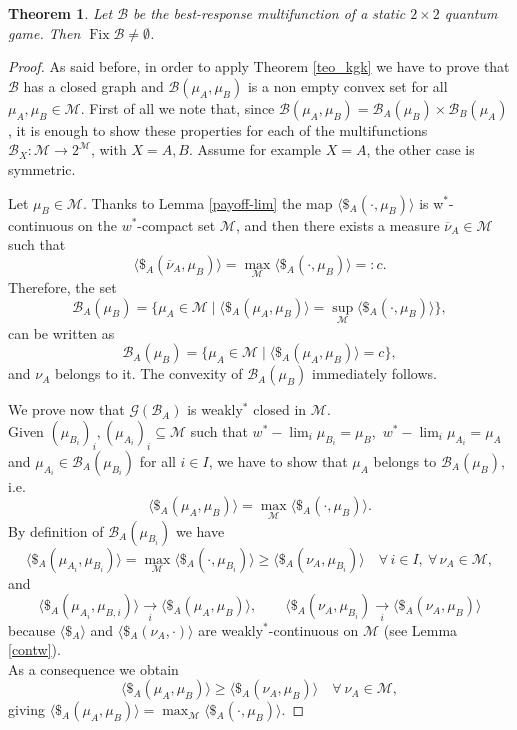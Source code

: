 \documentclass[11pt,a4paper,twoside]{article}
\newtheorem{theorem}{Theorem}
\begin{document}
\begin{theorem}\label{esistenza}
Let $\mathcal{B}$ be the best-response multifunction of a static $2\times 2$ quantum game. Then
$\operatorname{Fix} \mathcal{B} \neq \emptyset$.
\end{theorem}
\begin{proof}
As said before, in order to apply Theorem \ref{teo_kgk} we have to prove that $\mathcal{B}$ has a closed graph and $\mathcal{B}(\mu_A,\mu_B)$ is a non empty convex set for all $\mu_A,\mu_B\in\mathcal{M}$. First of all we note that, since $\mathcal{B}(\mu_A,\mu_B) = \mathcal{B}_A(\mu_B) \times \mathcal{B}_B(\mu_A)$, it is enough to show these properties for each of the multifunctions $\mathcal{B}_X:\mathcal{M}\to 2^\mathcal{M}$, with $X=A,B$. Assume for example $X=A$, the other case is symmetric.

Let $\mu_B \in \mathcal{M}$. Thanks to Lemma \ref{payoff-lim} the map \( \langle\$_A (\cdot, \mu_B)\rangle\) is w$^*$-continuous on the $w^*$-compact set $\mathcal{M}$, and then there exists a measure $\overline{\nu}_A \in \mathcal{M}$ such that 
$$\langle\$_A (\overline{\nu}_A, \mu_B)\rangle = \max_\mathcal{M} \langle\$_A (\cdot, \mu_B)\rangle=:c.$$
Therefore, the set
\[
\mathcal{B}_A (\mu_B) = \{\mu_A \in \mathcal{M} \mid \langle\$_A (\mu_A, \mu_B)\rangle = \sup_{\mathcal{M}} \langle\$_A (\cdot, \mu_B)\rangle\},
\]
can be written as
 \[ \mathcal{B}_A (\mu_B) = \{\mu_A \in \mathcal{M} \mid \langle\$_A (\mu_A, \mu_B)\rangle = c\}, \] 
 and $\nu_A$ belongs to it.
 The convexity of $\mathcal{B}_A (\mu_B)$ immediately follows.

We prove now that $\mathcal{G}(\mathcal{B}_A)$ is weakly$^*$ closed in $\mathcal{M}$.\\
Given \((\mu_{B_i})_i, (\mu_{A_i})_i \subseteq \mathcal{M}\) such that $w^*-\lim_i\mu_{B_i}=\mu_B$,\ $w^*-\lim_i\mu_{A_i}=\mu_A$ and \(\mu_{A_i} \in \mathcal{B}_A (\mu_{B_i})\) for all $i\in I$, we have to show that \(\mu_A\) belongs to $\mathcal{B}_A (\mu_B)$, i.e. \[\langle \$_A (\mu_A, \mu_B)\rangle =\max_{\mathcal{M}} \langle\$_A (\cdot, \mu_B)\rangle.\]
By definition of $\mathcal{B}_A (\mu_{B_i})$ we have
\[ \langle\$_A (\mu_{A_i}, \mu_{B_i})\rangle = \max_\mathcal{M} \langle\$_A (\cdot, \mu_{B_i})\rangle \geq \langle\$_A (\nu_A, \mu_{B_i})\rangle \quad \forall\, i\in I,\  \forall\, \nu_A \in \mathcal{M},\]
and $$\langle\$_A(\mu_{A_i}, \mu_{B,i})\rangle \xrightarrow[i]{} \langle\$_A(\mu_A, \mu_B)\rangle,\qquad\langle\$_A(\nu_A, \mu_{B_i}) \xrightarrow[i]{} \langle\$_A(\nu_A, \mu_B)\rangle$$ because $\langle\$_A\rangle$ and $\langle\$_A(\nu_A, \cdot)\rangle$ are weakly$^*$-continuous on $\mathcal{M}$ (see Lemma \ref{contw}).\\
As a consequence we obtain
$$\langle\$_A(\mu_A, \mu_B)\rangle \geq \langle\$_A(\nu_A, \mu_B)\rangle \quad \forall\  \nu_A \in \mathcal{M},$$
giving $\langle\$_A(\mu_A, \mu_B)\rangle = \max_\mathcal{M} \langle\$_A(\cdot, \mu_B)\rangle$.
\end{proof}
\end{document}
